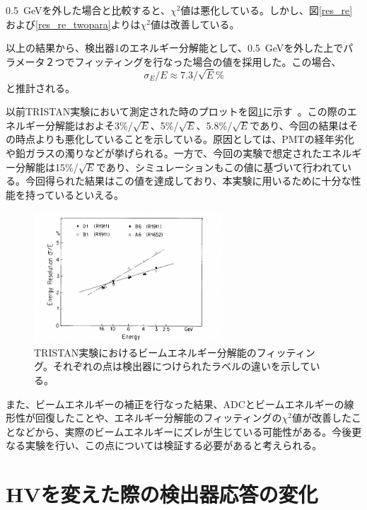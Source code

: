 \SI{0.5}{GeV}を外した場合と比較すると、$\chi^2$値は悪化している。しかし、図\ref{res_re}および\ref{res_re_twopara}よりは$\chi^2$値は改善している。

以上の結果から、検出器1のエネルギー分解能として、\SI{0.5}{GeV}を外した上でパラメータ２つでフィッティングを行なった場合の値を採用した。この場合、
\begin{equation}
\sigma_E/E\approx 7.3/\sqrt{E}\%
\end{equation}
と推計される。

以前TRISTAN実験において測定された時のプロットを図\ref{TRISTAN}に示す~\cite{LeadGlass}。この際のエネルギー分解能はおよそ3\%/$\sqrt{E}$、5\%/$\sqrt{E}$、5.8\%/$\sqrt{E}$であり、今回の結果はその時点よりも悪化していることを示している。原因としては、PMTの経年劣化や鉛ガラスの濁りなどが挙げられる。一方で、今回の実験で想定されたエネルギー分解能は15\%/$\sqrt{E}$であり、シミュレーションもこの値に基づいて行われている。今回得られた結果はこの値を達成しており、本実験に用いるために十分な性能を持っているといえる。

\begin{figure}[H]
	\begin{center}
		\includegraphics[width=200pt]{./Figure/EBESAnalysis/TRISTAN.png}
		\caption[TRISTAN実験におけるビームエネルギー分解能のフィッティング]{TRISTAN実験におけるビームエネルギー分解能のフィッティング。それぞれの点は検出器につけられたラベルの違いを示している。}
		\label{TRISTAN}
	\end{center}
\end{figure}


また、ビームエネルギーの補正を行なった結果、ADCとビームエネルギーの線形性が回復したことや、エネルギー分解能のフィッティングの$\chi^2$値が改善したことなどから、実際のビームエネルギーにズレが生じている可能性がある。今後更なる実験を行い、この点については検証する必要があると考えられる。

\section{HVを変えた際の検出器応答の変化}

